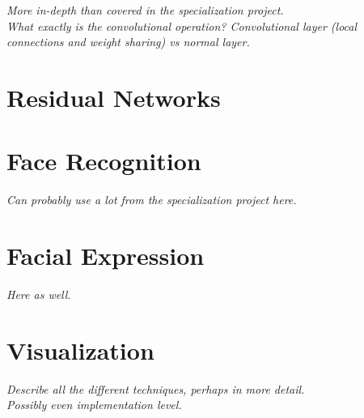 \textit{More in-depth than covered in the specialization project. \\
What exactly is the convolutional operation? Convolutional layer (local connections and weight sharing) vs normal layer.}

\section{Residual Networks}

\section{Face Recognition}

\textit{Can probably use a lot from the specialization project here.}

\section{Facial Expression}

\textit{Here as well.}

\section{Visualization}

\textit{Describe all the different techniques, perhaps in more detail. \\
Possibly even implementation level.}

\cleardoublepage
